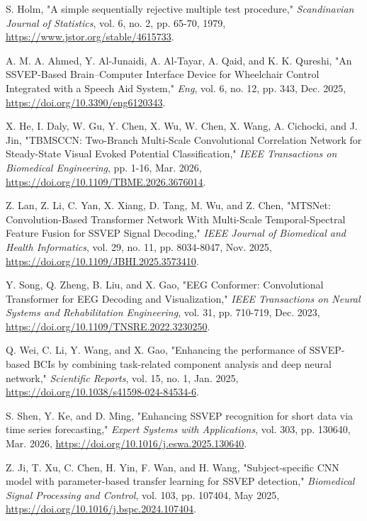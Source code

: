  S. Holm, "A simple sequentially rejective multiple test procedure," \textit{Scandinavian Journal of Statistics}, vol. 6, no. 2, pp. 65-70, 1979, \url{https://www.jstor.org/stable/4615733}.

 A. M. A. Ahmed, Y. Al-Junaidi, A. Al-Tayar, A. Qaid, and K. K. Qureshi, "An SSVEP-Based Brain–Computer Interface Device for Wheelchair Control Integrated with a Speech Aid System," \textit{Eng}, vol. 6, no. 12, pp. 343, Dec. 2025, \url{https://doi.org/10.3390/eng6120343}.

 X. He, I. Daly, W. Gu, Y. Chen, X. Wu, W. Chen, X. Wang, A. Cichocki, and J. Jin, "TBMSCCN: Two-Branch Multi-Scale Convolutional Correlation Network for Steady-State Visual Evoked Potential Classification," \textit{IEEE Transactions on Biomedical Engineering}, pp. 1-16, Mar. 2026, \url{https://doi.org/10.1109/TBME.2026.3676014}.

 Z. Lan, Z. Li, C. Yan, X. Xiang, D. Tang, M. Wu, and Z. Chen, "MTSNet: Convolution-Based Transformer Network With Multi-Scale Temporal-Spectral Feature Fusion for SSVEP Signal Decoding," \textit{IEEE Journal of Biomedical and Health Informatics}, vol. 29, no. 11, pp. 8034-8047, Nov. 2025, \url{https://doi.org/10.1109/JBHI.2025.3573410}.

 Y. Song, Q. Zheng, B. Liu, and X. Gao, "EEG Conformer: Convolutional Transformer for EEG Decoding and Visualization," \textit{IEEE Transactions on Neural Systems and Rehabilitation Engineering}, vol. 31, pp. 710-719, Dec. 2023, \url{https://doi.org/10.1109/TNSRE.2022.3230250}.

 Q. Wei, C. Li, Y. Wang, and X. Gao, "Enhancing the performance of SSVEP-based BCIs by combining task-related component analysis and deep neural network," \textit{Scientific Reports}, vol. 15, no. 1, Jan. 2025, \url{https://doi.org/10.1038/s41598-024-84534-6}.

 S. Shen, Y. Ke, and D. Ming, "Enhancing SSVEP recognition for short data via time series forecasting," \textit{Expert Systems with Applications}, vol. 303, pp. 130640, Mar. 2026, \url{https://doi.org/10.1016/j.eswa.2025.130640}.

 Z. Ji, T. Xu, C. Chen, H. Yin, F. Wan, and H. Wang, "Subject-specific CNN model with parameter-based transfer learning for SSVEP detection," \textit{Biomedical Signal Processing and Control}, vol. 103, pp. 107404, May 2025, \url{https://doi.org/10.1016/j.bspc.2024.107404}.

